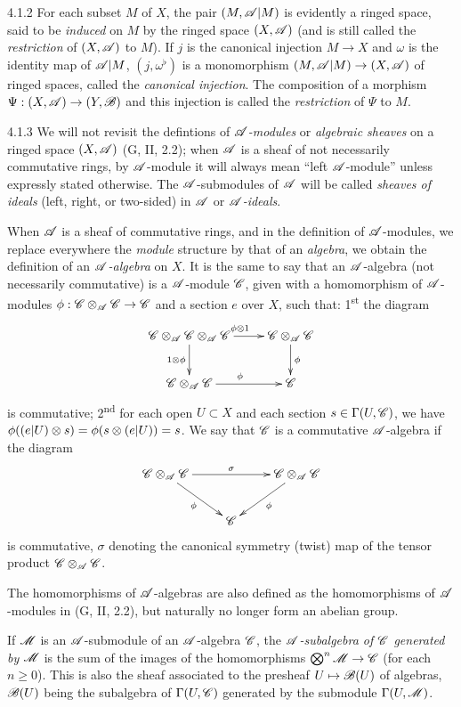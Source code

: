 \begin{env}{4.1.2}
\label{env-0.4.1.2}
For each subset $M$ of $X$, the pair $(M,\mathscr{A}|M)$ is evidently a ringed space, said
to be \emph{induced} on $M$ by the ringed space $(X,\mathscr{A})$ (and is still called
the \emph{restriction} of $(X,\mathscr{A})$ to $M$). If $j$ is the canonical injection
$M\to X$ and $\omega$ is the identity map of $\mathscr{A}|M$, $(j,\omega^\flat)$ is a
monomorphism $(M,\mathscr{A}|M)\to(X,\mathscr{A})$ of ringed spaces, called the
\emph{canonical injection}. The composition of a morphism
$\Psi:(X,\mathscr{A})\to(Y,\mathscr{B})$ and this injection is called the \emph{restriction}
of $\Psi$ to $M$.
\end{env}

\begin{env}{4.1.3}
\label{env-0.4.1.3}
We will not revisit the defintions of \emph{$\mathscr{A}$-modules} or
\emph{algebraic sheaves} on a ringed space $(X,\mathscr{A})$ (G, II, 2.2);
when $\mathscr{A}$ is a sheaf of not necessarily commutative rings, by $\mathscr{A}$-module
it will always mean ``left $\mathscr{A}$-module'' unless expressly stated otherwise. The
$\mathscr{A}$-submodules of $\mathscr{A}$ will be called \emph{sheaves of ideals} (left,
right, or two-sided) in $\mathscr{A}$ or \emph{$\mathscr{A}$-ideals}.

When $\mathscr{A}$ is a sheaf of commutative rings, and in the definition of
$\mathscr{A}$-modules, we replace everywhere the \emph{module} structure by that of
an \emph{algebra}, we obtain the definition of an \emph{$\mathscr{A}$-algebra} on $X$.
It is the same to say that an $\mathscr{A}$-algebra (not necessarily commutative) is
a $\mathscr{A}$-module $\mathscr{C}$, given with a homomorphism of $\mathscr{A}$-modules
$\phi:\mathscr{C}\otimes_\mathscr{A}\mathscr{C}\to\mathscr{C}$ and a section $e$ over $X$,
such that: 1\textsuperscript{st} the diagram
\[
  \xymatrix{
    \sh{C}\otimes_\sh{A}\sh{C}\otimes_\sh{A}\sh{C}
    \ar[r]^{\vphi\otimes 1}\ar[d]_{1\otimes\vphi} &
    \sh{C}\otimes_\sh{A}\sh{C}\ar[d]^\vphi\\
    \sh{C}\otimes_\sh{A}\sh{C}\ar[r]^\vphi & \sh{C}
  }
\]
is commutative; 2\textsuperscript{nd} for each open $U\subset X$ and each section
$s\in\Gamma(U,\mathscr{C})$, we have $\phi((e|U)\otimes s)=\phi(s\otimes(e|U))=s$.
We say that $\mathscr{C}$ is a commutative $\mathscr{A}$-algebra if the diagram
\[
  \xymatrix{
    \sh{C}\otimes_\sh{A}\sh{C}\ar[rr]^\sigma\ar[rd]_\vphi
    & & \sh{C}\otimes_\sh{A}\sh{C}\ar[ld]^\vphi\\
    & \sh{C}
  }
\]
is commutative, $\sigma$ denoting the canonical symmetry (twist) map of the tensor product
$\mathscr{C}\otimes_\mathscr{A}\mathscr{C}$.

The homomorphisms of $\mathscr{A}$-algebras are also defined as the homomorphisms of
$\mathscr{A}$-modules in (G, II, 2.2), but naturally no longer form an abelian group.

If $\mathscr{M}$ is an $\mathscr{A}$-submodule of an $\mathscr{A}$-algebra $\mathscr{C}$, the
\emph{$\mathscr{A}$-subalgebra of $\mathscr{C}$ generated by $\mathscr{M}$} is the sum of the images of the
homomorphisms $\bigotimes^n\mathscr{M}\to\mathscr{C}$ (for each $n\geqslant 0$). This is also the sheaf
associated to the presheaf $U\mapsto\mathscr{B}(U)$ of algebras, $\mathscr{B}(U)$ being the subalgebra
of $\Gamma(U,\mathscr{C})$ generated by the submodule $\Gamma(U,\mathscr{M})$.
\end{env}

